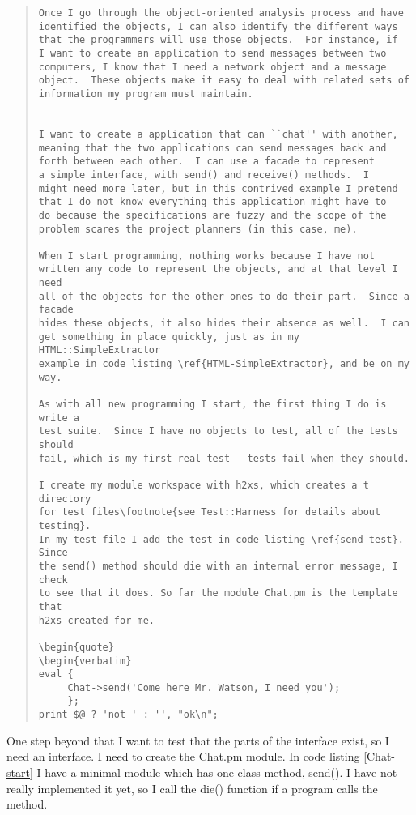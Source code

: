 \begin{quote}
\begin{verbatim}
Once I go through the object-oriented analysis process and have
identified the objects, I can also identify the different ways
that the programmers will use those objects.  For instance, if
I want to create an application to send messages between two 
computers, I know that I need a network object and a message
object.  These objects make it easy to deal with related sets of
information my program must maintain.


I want to create a application that can ``chat'' with another,
meaning that the two applications can send messages back and
forth between each other.  I can use a facade to represent
a simple interface, with send() and receive() methods.  I 
might need more later, but in this contrived example I pretend
that I do not know everything this application might have to
do because the specifications are fuzzy and the scope of the
problem scares the project planners (in this case, me).

When I start programming, nothing works because I have not
written any code to represent the objects, and at that level I need
all of the objects for the other ones to do their part.  Since a facade
hides these objects, it also hides their absence as well.  I can
get something in place quickly, just as in my HTML::SimpleExtractor
example in code listing \ref{HTML-SimpleExtractor}, and be on my way.

As with all new programming I start, the first thing I do is write a
test suite.  Since I have no objects to test, all of the tests should
fail, which is my first real test---tests fail when they should.  

I create my module workspace with h2xs, which creates a t directory
for test files\footnote{see Test::Harness for details about testing}.
In my test file I add the test in code listing \ref{send-test}.  Since
the send() method should die with an internal error message, I check
to see that it does. So far the module Chat.pm is the template that
h2xs created for me.

\begin{quote}
\begin{verbatim}
eval {
     Chat->send('Come here Mr. Watson, I need you');
     };
print $@ ? 'not ' : '', "ok\n";
\end{verbatim}
\end{quote}

One step beyond that I want to test that the parts of the interface
exist, so I need an interface.  I need to create the Chat.pm module.
In code listing \ref{Chat-start} I have a minimal module which has one
class method, send().  I have not really implemented it yet, so I call
the die() function if a program calls the method.

